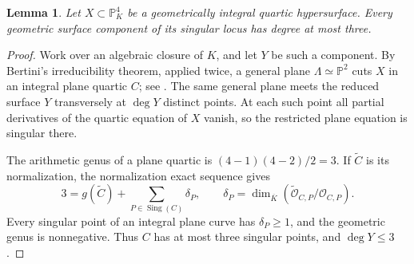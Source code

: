 \documentclass[11pt,a4paper]{article}
\newtheorem{lemma}[theorem]{Lemma}
\theoremstyle{definition}
\newcommand{\PP}{\mathbb P}
\begin{document}
\begin{lemma}\label{lb:quartic-singular-surface}
Let $X\subset\PP^4_K$ be a geometrically integral quartic
hypersurface. Every geometric surface component of its singular
locus has degree at most three.
\end{lemma}
\begin{proof}
Work over an algebraic closure of $K$, and let $Y$ be such a
component. By Bertini's irreducibility theorem, applied twice,
a general plane $\Lambda\simeq\PP^2$ cuts $X$ in an integral
plane quartic $C$; see \cite[Lemma~37.32.3]{StacksBertini}.
The same general plane meets the reduced surface $Y$
transversely at $\deg Y$ distinct points. At each such point
all partial derivatives of the quartic equation of $X$ vanish,
so the restricted plane equation is singular there.

The arithmetic genus of a plane quartic is
$(4-1)(4-2)/2=3$. If $\widetilde C$ is its normalization, the
normalization exact sequence gives
\[
 3=g(\widetilde C)+\sum_{P\in\operatorname{Sing}(C)}\delta_P,
 \qquad
 \delta_P=\dim_{\overline K}
              (\widetilde{\mathcal O}_{C,P}/\mathcal O_{C,P}).
\]
Every singular point of an integral plane curve has
$\delta_P\ge1$, and the geometric genus is nonnegative.
Thus $C$ has at most three singular points, and $\deg Y\le3$.
\end{proof}
\end{document}
